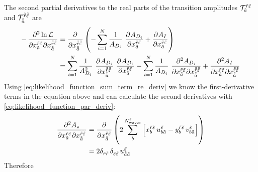 The second partial derivatives \wrt to the real parts of the
transition amplitudes
$\mathcal{T}_{\tilde{a}}^{\tilde{r} \tilde{\varepsilon}}$ and
$\mathcal{T}_{\tilde{\tilde{a}}}^{\tilde{\tilde{r}} \tilde{\tilde{\varepsilon}}}$
are
\begin{align}
  -\dmd{\ln \mathcal{L}}{2}{{x_{\tilde{a}}^{\tilde{r} \tilde{\refl}}}}{}{{x_{\doubletilde{a}}^{\doubletilde{r} \doubletilde{\refl}}}}{}
  &= \dpd{}{{x_{\doubletilde{a}}^{\doubletilde{r} \doubletilde{\refl}}}}
    \rBrk{-\sum_{i = 1}^{N} \frac{1}{A_{D_i}}\, \dpd{A_{D_i}}{{x_{\tilde{a}}^{\tilde{r} \tilde{\refl}}}} + \dpd{A_I}{{x_{\tilde{a}}^{\tilde{r} \tilde{\refl}}}}} \\
  &= \sum_{i = 1}^{N} \frac{1}{A_{D_i}^2}\, \dpd{A_{D_i}}{{x_{\doubletilde{a}}^{\doubletilde{r} \doubletilde{\refl}}}}\, \dpd{A_{D_i}}{{x_{\tilde{a}}^{\tilde{r} \tilde{\refl}}}}
    - \sum_{i = 1}^{N} \frac{1}{A_{D_i}}\, \dmd{A_{D_i}}{2}{{x_{\tilde{a}}^{\tilde{r} \tilde{\refl}}}}{}{{x_{\doubletilde{a}}^{\doubletilde{r} \doubletilde{\refl}}}}{}
    + \dmd{A_I}{2}{{x_{\tilde{a}}^{\tilde{r} \tilde{\refl}}}}{}{{x_{\doubletilde{a}}^{\doubletilde{r} \doubletilde{\refl}}}}{}
\end{align}
Using \cref{eq:likelihood_function_sum_term_re_deriv} we know the
first-derivative terms in the equation above and can calculate the
second derivatives with \cref{eq:likelihood_function_par_deriv}:
\begin{align}
  \label{eq:likelihood_function_sum_term_re_re_deriv}
  \dmd{A_z}{2}{{x_{\tilde{a}}^{\tilde{r} \tilde{\refl}}}}{}{{x_{\doubletilde{a}}^{\doubletilde{r} \doubletilde{\refl}}}}{}
  &= \dpd{}{{x_{\doubletilde{a}}^{\doubletilde{r} \doubletilde{\refl}}}}
    \rBrk{2 \sum_b^{N^{\tilde{\refl}}_\text{waves}} \sBrk{x_b^{\tilde{r} \tilde{\refl}}\, u^{\tilde{\refl}}_{b \tilde{a}}
    - y_b^{\tilde{r} \tilde{\refl}}\, v^{\tilde{\refl}}_{b \tilde{a}}}} \\
  \label{eq:likelihood_function_sum_term_re_re_deriv}
  &= 2 \delta_{\tilde{r} \doubletilde{r}}\, \delta_{\tilde{\refl} \doubletilde{\refl}}\, u^{\tilde{\refl}}_{\doubletilde{a} \tilde{a}}
\end{align}
Therefore
